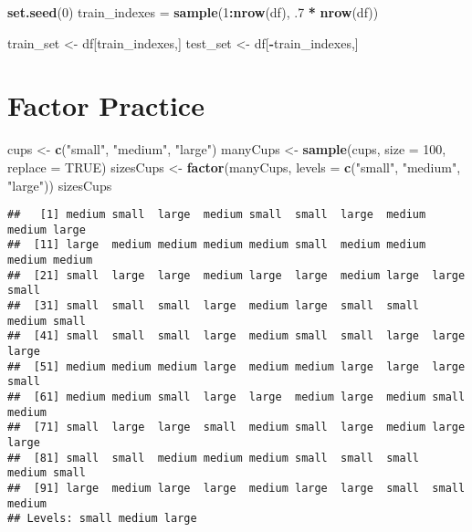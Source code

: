 \documentclass[]{book}
\newenvironment{Shaded}{\begin{snugshade}}{\end{snugshade}}
\newcommand{\DataTypeTok}[1]{\textcolor[rgb]{0.13,0.29,0.53}{#1}}
\newcommand{\DecValTok}[1]{\textcolor[rgb]{0.00,0.00,0.81}{#1}}
\newcommand{\FloatTok}[1]{\textcolor[rgb]{0.00,0.00,0.81}{#1}}
\newcommand{\KeywordTok}[1]{\textcolor[rgb]{0.13,0.29,0.53}{\textbf{#1}}}
\newcommand{\NormalTok}[1]{#1}
\newcommand{\OperatorTok}[1]{\textcolor[rgb]{0.81,0.36,0.00}{\textbf{#1}}}
\newcommand{\OtherTok}[1]{\textcolor[rgb]{0.56,0.35,0.01}{#1}}
\newcommand{\StringTok}[1]{\textcolor[rgb]{0.31,0.60,0.02}{#1}}
\begin{document}
\begin{Shaded}
\begin{Highlighting}[]
\KeywordTok{set.seed}\NormalTok{(}\DecValTok{0}\NormalTok{)}
\NormalTok{train_indexes =}\StringTok{ }\KeywordTok{sample}\NormalTok{(}\DecValTok{1}\OperatorTok{:}\KeywordTok{nrow}\NormalTok{(df), }\FloatTok{.7} \OperatorTok{*}\StringTok{ }\KeywordTok{nrow}\NormalTok{(df))}

\NormalTok{train_set <-}\StringTok{ }\NormalTok{df[train_indexes,]}
\NormalTok{test_set <-}\StringTok{ }\NormalTok{df[}\OperatorTok{-}\NormalTok{train_indexes,]}
\end{Highlighting}
\end{Shaded}

\hypertarget{factor-practice}{%
\chapter{Factor Practice}\label{factor-practice}}

\begin{Shaded}
\begin{Highlighting}[]
\NormalTok{cups <-}\StringTok{ }\KeywordTok{c}\NormalTok{(}\StringTok{"small"}\NormalTok{, }\StringTok{"medium"}\NormalTok{, }\StringTok{"large"}\NormalTok{)}
\NormalTok{manyCups <-}\StringTok{ }\KeywordTok{sample}\NormalTok{(cups, }\DataTypeTok{size =} \DecValTok{100}\NormalTok{, }\DataTypeTok{replace =} \OtherTok{TRUE}\NormalTok{)}
\NormalTok{sizesCups <-}\StringTok{ }\KeywordTok{factor}\NormalTok{(manyCups, }\DataTypeTok{levels =} \KeywordTok{c}\NormalTok{(}\StringTok{"small"}\NormalTok{, }\StringTok{"medium"}\NormalTok{, }\StringTok{"large"}\NormalTok{))}
\NormalTok{sizesCups}
\end{Highlighting}
\end{Shaded}

\begin{verbatim}
##   [1] medium small  large  medium small  small  large  medium medium large 
##  [11] large  medium medium medium medium small  medium medium medium medium
##  [21] small  large  large  medium large  large  medium large  large  small 
##  [31] small  small  small  large  medium large  small  small  medium small 
##  [41] small  small  small  large  medium small  small  large  large  large 
##  [51] medium medium medium large  medium medium large  large  large  small 
##  [61] medium medium small  large  large  medium large  medium small  medium
##  [71] small  large  large  small  medium small  large  medium large  large 
##  [81] small  small  medium medium medium small  small  small  medium small 
##  [91] large  medium large  large  medium large  large  small  small  medium
## Levels: small medium large
\end{verbatim}
\end{document}
